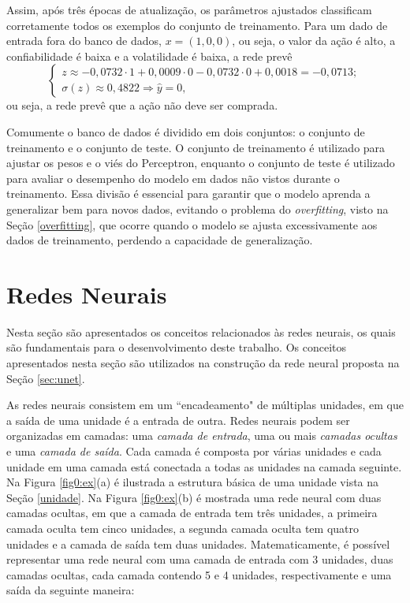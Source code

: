 Assim, após três épocas de atualização, os parâmetros ajustados classificam corretamente todos os exemplos do conjunto de treinamento. Para um dado de entrada fora do banco de dados, $x = (1,0,0)$, ou seja, o valor da ação é alto, a confiabilidade é baixa e a volatilidade é baixa, a rede prevê
$$
\begin{cases}
z \approx -0,0732\cdot 1 + 0,0009\cdot 0 - 0,0732\cdot 0 + 0,0018 = -0,0713; \\
\sigma(z) \approx 0,4822 \Rightarrow \hat{y} = 0,
\end{cases}
$$
ou seja, a rede prevê que a ação não deve ser comprada.

Comumente o banco de dados é dividido em dois conjuntos: o conjunto de treinamento e o conjunto de teste. O conjunto de treinamento é utilizado para ajustar os pesos e o viés do Perceptron, enquanto o conjunto de teste é utilizado para avaliar o desempenho do modelo em dados não vistos durante o treinamento. Essa divisão é essencial para garantir que o modelo aprenda a generalizar bem para novos dados, evitando o problema do \textit{overfitting}, visto na Seção \ref{overfitting}, que ocorre quando o modelo se ajusta excessivamente aos dados de treinamento, perdendo a capacidade de generalização.


\section{Redes Neurais}
\label{redesNeurais}

\label{sec_2}
Nesta seção são apresentados os conceitos relacionados às redes neurais, os quais são fundamentais para o desenvolvimento deste trabalho. Os conceitos apresentados nesta seção são utilizados na construção da rede neural proposta na Seção \ref{sec:unet}.

As redes neurais consistem em um ``encadeamento" de múltiplas unidades, em que a saída de uma unidade é a entrada de outra. Redes neurais podem ser organizadas em camadas: uma \textit{camada de entrada}, uma ou mais \textit{camadas ocultas} e uma \textit{camada de saída}. Cada camada é composta por várias unidades e cada unidade em uma camada está conectada a todas as unidades na camada seguinte. Na Figura \ref{fig0:ex}(a) é ilustrada a estrutura básica de uma unidade vista na Seção \ref{unidade}. Na Figura \ref{fig0:ex}(b) é mostrada uma rede neural com duas camadas ocultas, em que a camada de entrada tem três unidades, a primeira camada oculta tem cinco unidades, a segunda camada oculta tem quatro unidades e a camada de saída tem duas unidades. Matematicamente, é possível representar uma rede neural com uma camada de entrada com 3 unidades, duas camadas ocultas, cada camada contendo 5 e 4 unidades, respectivamente e uma saída da seguinte maneira:


